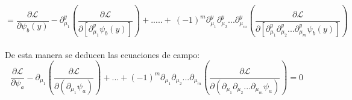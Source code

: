\documentclass[a4paper,12pt]{article}
\begin{document}
{\small
\begin{equation}
=\frac{\partial\mathscr{L} }{\partial \psi_b(y) }-\partial_{\mu_1}^y\left(\frac{\partial \mathscr{L}}{\partial[\partial _{\mu_1}^y\psi_b(y)]}\right)+.....+\ (-1)^m\partial_{\mu_1}^y\partial_{\mu_2}^y...\partial_{\mu_m}^y\left(\frac{\partial \mathscr{L}}{\partial [\partial_{\mu_1}^y\partial_{\mu_2}^y...\partial_{\mu_m}^y\psi_b(y)]}\right)
\end{equation}}\\
De esta manera se deducen las ecuaciones de campo:
\begin{equation}
\frac{\partial\mathscr{L} }{\partial \psi_a}-\partial_{\mu_1}\left(\frac{\partial \mathscr{L}}{\partial(\partial _{\mu_1}\psi_a)}\right)+...+(-1)^m\partial_{\mu_1}\partial_{\mu_2}...\partial_{\mu_m}\left(\frac{\partial \mathscr{L}}{\partial (\partial_{\mu_1}\partial_{\mu_2}...\partial_{\mu_m}\psi_a)}\right)=0 
\end{equation}
\vspace{0,4cm}

\\
\end{document}
